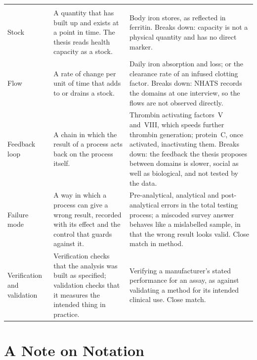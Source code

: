 \begin{longtable}{>{\raggedright\arraybackslash}p{2.7cm} >{\raggedright\arraybackslash}p{4.6cm} >{\raggedright\arraybackslash}p{6.6cm}}
\midrule
\multicolumn{3}{l}{\textit{Systems terms}} \\
\addlinespace
Stock & A quantity that has built up and exists at a point in time. The thesis reads health capacity as a stock. & Body iron stores, as reflected in ferritin. Breaks down: capacity is not a physical quantity and has no direct marker. \\
Flow & A rate of change per unit of time that adds to or drains a stock. & Daily iron absorption and loss; or the clearance rate of an infused clotting factor. Breaks down: NHATS records the domains at one interview, so the flows are not observed directly. \\
Feedback loop & A chain in which the result of a process acts back on the process itself. & Thrombin activating factors~V and~VIII, which speeds further thrombin generation; protein~C, once activated, inactivating them. Breaks down: the feedback the thesis proposes between domains is slower, social as well as biological, and not tested by the data. \\
Failure mode & A way in which a process can give a wrong result, recorded with its effect and the control that guards against it. & Pre-analytical, analytical and post-analytical errors in the total testing process; a miscoded survey answer behaves like a mislabelled sample, in that the wrong result looks valid. Close match in method. \\
Verification and validation & Verification checks that the analysis was built as specified; validation checks that it measures the intended thing in practice. & Verifying a manufacturer's stated performance for an assay, as against validating a method for its intended clinical use. Close match. \\
\end{longtable}
\endgroup

\section*{A Note on Notation}
\label{sec:guide-notation}

